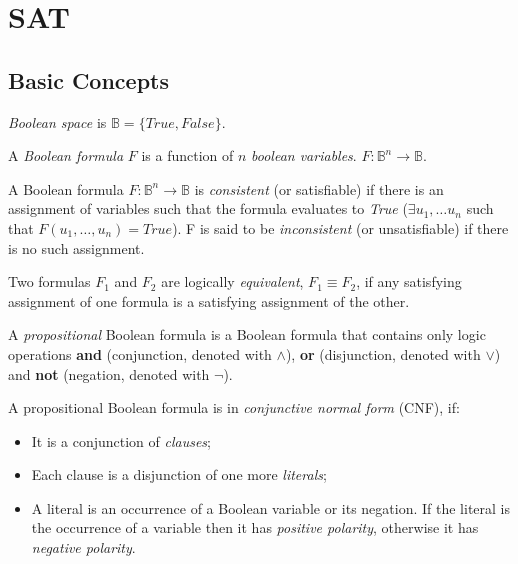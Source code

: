 \chapter{SAT}
\label{chap:sat}

\section{Basic Concepts}

\begin{mydef}
  \emph{Boolean space} is $\mathbb{B} = \{ True, False \}$.
\end{mydef}

\begin{mydef}
  A \emph{Boolean formula} $F$ is a function of $n$ \emph{boolean variables}.
  $F : \mathbb{B}^n \rightarrow \mathbb{B}$.
\end{mydef}

\begin{mydef}
  A Boolean formula $F : \mathbb{B}^n \rightarrow \mathbb{B}$ is
  \emph{consistent} (or satisfiable) if there is an assignment of
  variables such that the formula evaluates to \emph{True}
  ($\exists u_1, \ldots u_n$ such that $F(u_1, \ldots, u_n) = True$).
  F is said to be \emph{inconsistent} (or unsatisfiable) if
  there is no such assignment.
\end{mydef}

\begin{mydef}
  Two formulas $F_1$ and $F_2$ are logically \emph{equivalent},
  $F_1 \equiv F_2$, if any satisfying assignment of one formula is
  a satisfying assignment of the other.
\end{mydef}

\begin{mydef}
  A \emph{propositional} Boolean formula is a Boolean formula that contains only
  logic operations \textbf{and} (conjunction, denoted with $\land$),
  \textbf{or} (disjunction, denoted with $\lor$) and \textbf{not}
  (negation, denoted with $\neg$).
\end{mydef}

A propositional Boolean formula is in \emph{conjunctive normal form}
(CNF), if:
\begin{itemize}
  \item It is a conjunction of \emph{clauses};
  \item Each clause is a disjunction of one more \emph{literals};
  \item A literal is an occurrence of a Boolean variable or its negation.
  If the literal is the occurrence of a variable
  then it has \emph{positive polarity}, otherwise it has \emph{negative
  polarity}.
\end{itemize}

